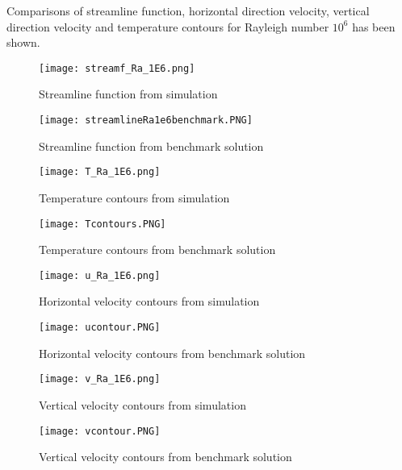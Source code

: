 Comparisons of streamline function, horizontal direction velocity, vertical direction velocity and temperature contours for Rayleigh number $10^6$ has been shown.

\begin{figure}[H]
  \centering
  \begin{minipage}[b]{0.45\textwidth}
    \texttt{[image: streamf\_Ra\_1E6.png]}
    \caption{Streamline function from simulation}
  \end{minipage}
  \hfill
  \begin{minipage}[b]{0.5\textwidth}
    \texttt{[image: streamlineRa1e6benchmark.PNG]}
    \caption{Streamline function from benchmark solution}
  \end{minipage}
\end{figure}

\begin{figure}[H]
  \centering
  \begin{minipage}[b]{0.5\textwidth}
    \texttt{[image: T\_Ra\_1E6.png]}
    \caption{Temperature contours from simulation}
  \end{minipage}
  \hfill
  \begin{minipage}[b]{0.4\textwidth}
    \texttt{[image: Tcontours.PNG]}
    \caption{Temperature contours from benchmark solution}
  \end{minipage}
\end{figure}

\begin{figure}[H]
  \centering
  \begin{minipage}[b]{0.5\textwidth}
    \texttt{[image: u\_Ra\_1E6.png]}
    \caption{Horizontal velocity contours from simulation}
  \end{minipage}
  \hfill
  \begin{minipage}[b]{0.4\textwidth}
    \texttt{[image: ucontour.PNG]}
    \caption{Horizontal velocity contours from benchmark solution}
  \end{minipage}
\end{figure}

\begin{figure}[H]
  \centering
  \begin{minipage}[b]{0.5\textwidth}
    \texttt{[image: v\_Ra\_1E6.png]}
    \caption{Vertical velocity contours from simulation}
  \end{minipage}
  \hfill
  \begin{minipage}[b]{0.4\textwidth}
    \texttt{[image: vcontour.PNG]}
    \caption{Vertical velocity contours from benchmark solution}
  \end{minipage}
\end{figure}



